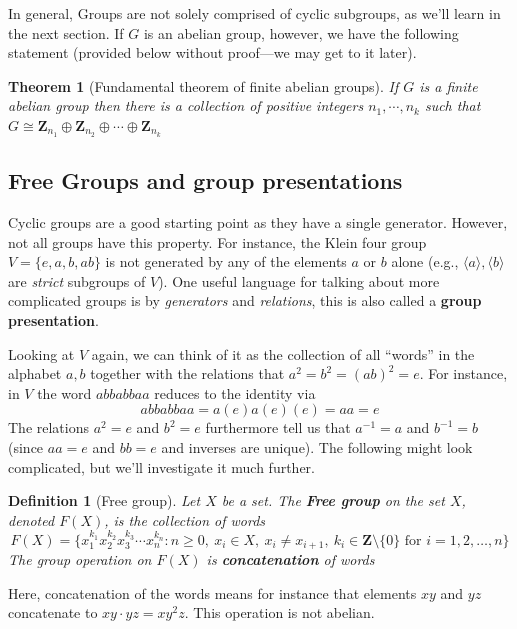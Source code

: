\documentclass[12pt]{article}
\numberwithin{equation}{subsection}
\newtheorem{thm}[subsection]{Theorem}
\newtheorem{defn}[subsection]{Definition}
\theoremstyle{note}
\newcommand{\Mod}[1]{\ (\mathrm{mod}\ #1)}
\begin{document}


In general, Groups are not solely comprised of cyclic subgroups, as we'll learn in the next section. If $G$ is an abelian group, however, we have the following statement (provided below without proof---we may get to it later).
\begin{thm}[Fundamental theorem of finite abelian groups]\label{FTFG}
	If $G$ is a finite abelian group then there is a collection of positive integers $n_1,\cdots,n_k$ such that $G\cong \mathbf{Z}_{n_1}\oplus \mathbf{Z}_{n_2} \oplus \cdots \oplus \mathbf{Z}_{n_k}$
\end{thm}



\subsection{Free Groups and group presentations}

Cyclic groups are a good starting point as they have a single generator. However, not all groups have this property. For instance, the Klein four group $V=\{e,a,b,ab\}$ is not generated by any of the elements $a$ or $b$ alone (e.g., $\langle a\rangle, \langle b\rangle$ are \textit{strict} subgroups of $V$). One useful language for talking about more complicated groups is by \textit{generators} and \textit{relations}, this is also called a \textbf{group presentation}.

Looking at $V$ again, we can think of it as the collection of all ``words'' in the alphabet $a,b$ together with the relations that $a^2=b^2=(ab)^2=e$. For instance, in $V$ the word $abbabbaa$ reduces to the identity via \[abbabbaa=a(e)a(e)(e)=aa=e\] The relations $a^2=e$ and $b^2=e$ furthermore tell us that $a^{-1}=a$ and $b^{-1}=b$ (since $aa=e$ and $bb=e$ and inverses are unique). The following might look complicated, but we'll investigate it much further.

\begin{defn}[Free group]
	Let $X$ be a set. The \textbf{Free group} on the set $X$, denoted $F(X)$,  is the collection of words \begin{equation} F(X)=\{ x_1^{k_1}x_2^{k_2}x_3^{k_3}\cdots x_n^{k_n} : n\geq 0,\ x_i\in X,\ x_i\neq x_{i+1},\ k_i\in\mathbf{Z}\setminus\{0\} \text{ for } i=1,2,\dots, n\} \end{equation}The group operation on $F(X)$ is \textbf{concatenation} of words
\end{defn}
Here, concatenation of the words means for instance that elements $xy$ and $yz$ concatenate to $xy\cdot yz=xy^2z$. This operation is not abelian.
\end{document}
